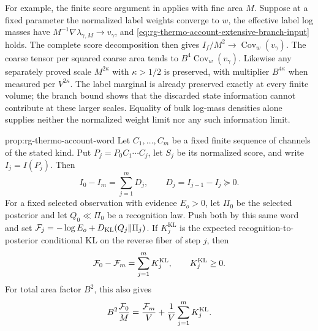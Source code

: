 For example, the finite score argument in
 applies with fine area $M$.
Suppose at a fixed parameter the normalized label weights
converge to $w$, the effective label log masses have
$M^{-1}\nabla\lambda_{\gamma,M}\to v_\gamma$, and
\cref{eq:rg-thermo-account-extensive-branch-input} holds. The complete
score decomposition then gives
$I_f/M^2\to\operatorname{Cov}_w(v_\gamma)$. The coarse tensor per
squared coarse area tends to
$B^4\operatorname{Cov}_w(v_\gamma)$. Likewise any separately proved
scale $M^{2\kappa}$ with $\kappa>1/2$ is preserved, with multiplier
$B^{4\kappa}$ when measured per $V^{2\kappa}$. The label marginal is
already preserved exactly at every finite volume; the branch bound
shows that the discarded state information cannot contribute at these
larger scales. Equality of bulk log-mass densities alone supplies neither the
normalized weight limit nor any such information limit.

{prop:rg-thermo-account-word}
Let $C_1,\ldots,C_m$ be a fixed finite sequence of channels of the
stated kind. Put $P_j=P_0C_1\cdots C_j$, let $S_j$ be its normalized
score, and write $I_j=I(P_j)$. Then
\begin{equation}
 I_0-I_m=\sum_{j=1}^m D_j,
 \qquad D_j=I_{j-1}-I_j\succeq0.
 \label{eq:rg-thermo-account-score-telescope}
\end{equation}
For a fixed selected observation with evidence $E_o>0$, let $\Pi_0$
be the selected posterior and let $Q_0\ll\Pi_0$ be a recognition law.
Push both by this same word and set
$\mathcal F_j=-\log E_o+D_{\mathrm{KL}}(Q_j\Vert\Pi_j)$. If $K_j^{\mathrm{KL}}$
is the expected recognition-to-posterior conditional KL on the reverse
fiber of step $j$, then
\begin{equation}
 \mathcal F_0-\mathcal F_m=\sum_{j=1}^m K_j^{\mathrm{KL}},
 \qquad K_j^{\mathrm{KL}}\geq0.
 \label{eq:rg-thermo-account-vfe-telescope}
\end{equation}
For total area factor $B^2$, this also gives
\begin{equation}
 B^2\frac{\mathcal F_0}{M}
 =\frac{\mathcal F_m}{V}+\frac{1}{V}\sum_{j=1}^mK_j^{\mathrm{KL}}.
 \label{eq:rg-thermo-account-vfe-area}
\end{equation}\thermoestablishedstatus


